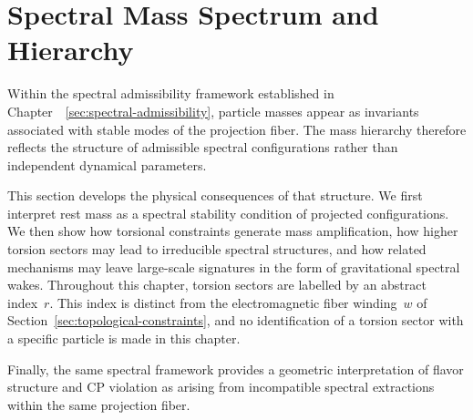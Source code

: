 \clearpage

\section{Spectral Mass Spectrum and Hierarchy}
  \label{sec:spectral-mass-hierarchy}

  Within the spectral admissibility framework established in
  Chapter~~\ref{sec:spectral-admissibility}, particle masses appear as invariants associated with
  stable modes of the projection fiber.
  The mass hierarchy therefore reflects the structure of admissible
  spectral configurations rather than independent dynamical
  parameters.

  This section develops the physical consequences of that structure.
  We first interpret rest mass as a spectral stability condition of
  projected configurations.
  We then show how torsional constraints generate mass amplification,
  how higher torsion sectors may lead to irreducible spectral
  structures, and how related
  mechanisms may leave large-scale signatures in the form of
  gravitational spectral wakes.
  Throughout this chapter, torsion sectors are labelled by an abstract
  index~$r$.
  This index is distinct from the electromagnetic fiber winding~$w$ of
  Section~\ref{sec:topological-constraints}, and no identification of a
  torsion sector with a specific particle is made in this chapter.

  Finally, the same spectral framework provides a geometric
  interpretation of flavor structure and CP violation as arising
  from incompatible spectral extractions within the same projection
  fiber.

  
  
  
  
  
  
